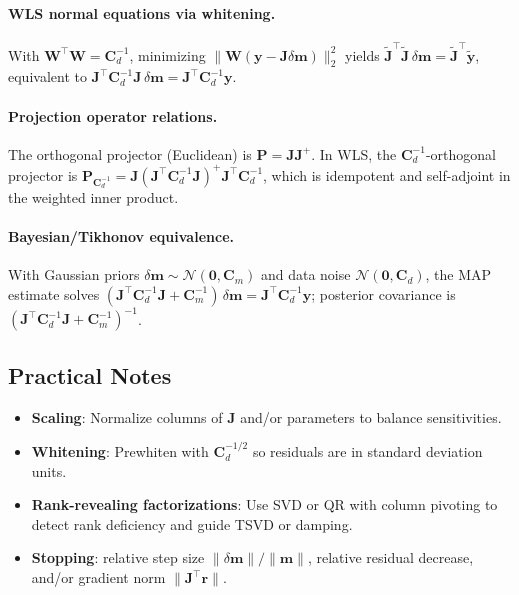 \documentclass[11pt,a4paper]{article}
\begin{document}
\paragraph{WLS normal equations via whitening.} With $\mathbf{W}^\top\mathbf{W}=\mathbf{C}_d^{-1}$, minimizing $\|\mathbf{W}(\mathbf{y}-\mathbf{J}\delta\mathbf{m})\|_2^2$ yields $\tilde{\mathbf{J}}^\top\tilde{\mathbf{J}}\,\delta\mathbf{m}=\tilde{\mathbf{J}}^\top \tilde{\mathbf{y}}$, equivalent to $\mathbf{J}^\top \mathbf{C}_d^{-1} \mathbf{J}\,\delta\mathbf{m}=\mathbf{J}^\top \mathbf{C}_d^{-1} \mathbf{y}$.

\paragraph{Projection operator relations.} The orthogonal projector (Euclidean) is $\mathbf{P}=\mathbf{J}\mathbf{J}^+$. In WLS, the $\mathbf{C}_d^{-1}$-orthogonal projector is $\mathbf{P}_{\mathbf{C}_d^{-1}}=\mathbf{J} (\mathbf{J}^\top \mathbf{C}_d^{-1} \mathbf{J})^{+} \mathbf{J}^\top \mathbf{C}_d^{-1}$, which is idempotent and self-adjoint in the weighted inner product.

\paragraph{Bayesian/Tikhonov equivalence.} With Gaussian priors $\delta\mathbf{m}\sim\mathcal{N}(\mathbf{0},\mathbf{C}_m)$ and data noise $\mathcal{N}(\mathbf{0},\mathbf{C}_d)$, the MAP estimate solves $(\mathbf{J}^\top \mathbf{C}_d^{-1}\mathbf{J}+\mathbf{C}_m^{-1})\,\delta\mathbf{m}=\mathbf{J}^\top \mathbf{C}_d^{-1}\mathbf{y}$; posterior covariance is $(\mathbf{J}^\top \mathbf{C}_d^{-1}\mathbf{J}+\mathbf{C}_m^{-1})^{-1}$.

\subsection{Practical Notes}
\begin{itemize}
  \item \textbf{Scaling}: Normalize columns of $\mathbf{J}$ and/or parameters to balance sensitivities.
  \item \textbf{Whitening}: Prewhiten with $\mathbf{C}_d^{-1/2}$ so residuals are in standard deviation units.
  \item \textbf{Rank-revealing factorizations}: Use SVD or QR with column pivoting to detect rank deficiency and guide TSVD or damping.
  \item \textbf{Stopping}: relative step size $\|\delta\mathbf{m}\|/\|\mathbf{m}\|$, relative residual decrease, and/or gradient norm $\|\mathbf{J}^\top \mathbf{r}\|$.
\end{itemize}
\end{document}
